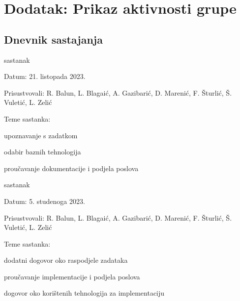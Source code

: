 \chapter*{Dodatak: Prikaz aktivnosti grupe}
		
		\section*{Dnevnik sastajanja}
	
		
		\begin{packed_enum}
			\item  sastanak
			
			\item[] \begin{packed_item}
				\item Datum: 21. listopada 2023.
				\item Prisustvovali: R. Balun, L. Blagaić, A. Gazibarić, D. Marenić, F. Šturlić, Š. Vuletić, L. Zelić
				\item Teme sastanka:
				\begin{packed_item}
					\item  upoznavanje s zadatkom
					\item  odabir baznih tehnologija
					\item  proučavanje dokumentacije i podjela poslova
				\end{packed_item}
			\end{packed_item}
			
			\item  sastanak
			\item[] \begin{packed_item}
				\item Datum: 5. studenoga 2023.
				\item Prisustvovali: R. Balun, L. Blagaić, A. Gazibarić, D. Marenić, F. Šturlić, Š. Vuletić, L. Zelić
				\item Teme sastanka:
				\begin{packed_item}
					\item  dodatni dogovor oko raspodjele zadataka
					\item  proučavanje implementacije i podjela poslova
					\item  dogovor oko korištenih tehnologija za implementaciju
				\end{packed_item}
			\end{packed_item}
			

\end{packed_enum}
